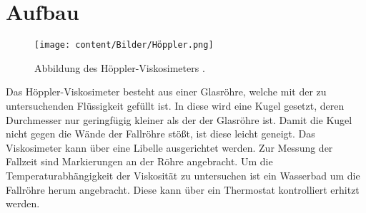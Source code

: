 \section{Aufbau}
\label{sec:Aufbau}
\begin{figure}
	\centering
	\texttt{[image: content/Bilder/Höppler.png]}
	\caption{Abbildung des Höppler-Viskosimeters \cite{V207}.}
	\label{fig:Aufbau2}
\end{figure}
Das Höppler-Viskosimeter besteht aus einer Glasröhre, welche mit der zu
untersuchenden Flüssigkeit gefüllt ist. In diese wird eine Kugel gesetzt, deren
Durchmesser nur geringfügig kleiner als der der Glasröhre ist. Damit die Kugel
nicht gegen die Wände der Fallröhre stößt, ist diese leicht geneigt. Das
Viskosimeter kann über eine Libelle ausgerichtet werden. Zur Messung
der Fallzeit sind Markierungen an der Röhre angebracht. Um die Temperaturabhängigkeit
der Viskosität zu untersuchen ist ein Wasserbad um die Fallröhre herum angebracht.
Diese kann über ein Thermostat kontrolliert erhitzt werden.
